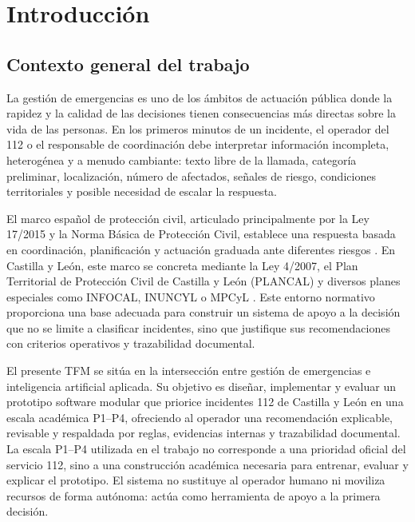 \chapter{Introducción}
\label{cap:1}

\section{Contexto general del trabajo}

La gestión de emergencias es uno de los ámbitos de actuación pública donde la rapidez y la calidad de las decisiones tienen consecuencias más directas sobre la vida de las personas. En los primeros minutos de un incidente, el operador del 112 o el responsable de coordinación debe interpretar información incompleta, heterogénea y a menudo cambiante: texto libre de la llamada, categoría preliminar, localización, número de afectados, señales de riesgo, condiciones territoriales y posible necesidad de escalar la respuesta.

El marco español de protección civil, articulado principalmente por la Ley 17/2015 y la Norma Básica de Protección Civil, establece una respuesta basada en coordinación, planificación y actuación graduada ante diferentes riesgos \cite{Ley17_2015,RD524_2023}. En Castilla y León, este marco se concreta mediante la Ley 4/2007, el Plan Territorial de Protección Civil de Castilla y León (PLANCAL) y diversos planes especiales como INFOCAL, INUNCYL o MPCyL \cite{Ley4_2007_CYL,PLANCAL_DEC_4_2019,INFOCAL_DEC_6_2025,INUNCYL,MPCYL_ACUERDO_3_2008}. Este entorno normativo proporciona una base adecuada para construir un sistema de apoyo a la decisión que no se limite a clasificar incidentes, sino que justifique sus recomendaciones con criterios operativos y trazabilidad documental.

El presente TFM se sitúa en la intersección entre gestión de emergencias e inteligencia artificial aplicada. Su objetivo es diseñar, implementar y evaluar un prototipo software modular que priorice incidentes 112 de Castilla y León en una escala académica P1--P4, ofreciendo al operador una recomendación explicable, revisable y respaldada por reglas, evidencias internas y trazabilidad documental. La escala P1--P4 utilizada en el trabajo no corresponde a una prioridad oficial del servicio 112, sino a una construcción académica necesaria para entrenar, evaluar y explicar el prototipo. El sistema no sustituye al operador humano ni moviliza recursos de forma autónoma: actúa como herramienta de apoyo a la primera decisión.

